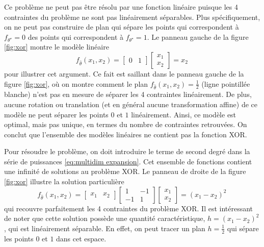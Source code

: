 Ce problème ne peut pas être résolu par une fonction linéaire puisque les 4 contraintes du problème ne sont pas linéairement séparables.
Plus spécifiquement, on ne peut pas construire de plan qui sépare les points qui correspondent à $f_{\theta^{\star}} = 0$ des points 
qui correspondent à $f_{\theta^{\star}} = 1$. Le panneau gauche de la figure \ref{fig:xor} montre le modèle linéaire
\begin{equation}\label{eq:sol1}
        f_{\hat{\theta}}(x_1, x_2) = \begin{bmatrix}0 & 1 \end{bmatrix} \begin{bmatrix} x_1 \\ x_2 \end{bmatrix} = x_2\, 
\end{equation}
pour illustrer cet argument. 
Ce fait est saillant dans le panneau gauche de la figure \ref{fig:xor}, où on montre comment le plan $f_{\hat{\theta}}(x_1, x_2) = \frac{1}{2}$ (ligne pointillée blanche) 
n'est pas en mesure de séparer les 4 contraintes linéairement.
De plus, aucune rotation ou translation (et en général aucune transformation affine) de ce modèle 
ne peut séparer les points $0$ et $1$ linéairement. 
Ainsi, ce modèle est optimal, mais pas unique, en termes du nombre de contraintes retrouvées. On conclut que l'ensemble des modèles linéaires ne contient pas 
la fonction XOR.

Pour résoudre le problème, on doit introduire le terme de second degré dans la série de puissances \eqref{eq:multidim expansion}. 
Cet ensemble de fonctions contient une infinité de solutions au problème XOR. Le panneau de droite de la figure \ref{fig:xor} 
illustre la solution particulière
\begin{equation}\label{eq:sol quad}
        f_{\hat{\theta}}(x_1, x_2) = \begin{bmatrix} x_1 & x_2 \end{bmatrix} \begin{bmatrix} 1 & -1 \\ -1 & 1 \end{bmatrix} \begin{bmatrix} x_1 \\ x_2 \end{bmatrix} = (x_1 - x_2)^2\,
\end{equation} 
qui recouvre parfaitement les 4 contraintes du problème XOR. Il est intéressant de noter que 
cette solution possède une quantité caractéristique, $h = (x_1 - x_2)^2$, qui est linéairement séparable. En effet, 
on peut tracer un plan $h = \frac{1}{2}$ qui sépare les points $0$ et $1$ dans cet espace. 

